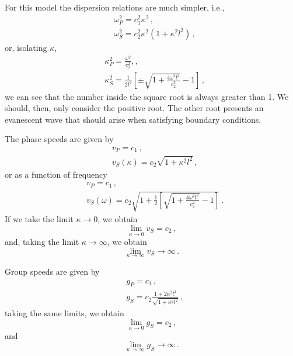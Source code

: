 \documentclass[12pt]{article}
\begin{document}
For this model the dispersion relations are much simpler, i.e.,
\begin{align*}
&\omega_P^2 = c_1^2 \kappa^2\, ,\\
&\omega_S^2 = c_2^2 \kappa^2 (1 + \kappa^2 l^2)\, ,
\end{align*}
or, isolating \(\kappa\),
\begin{align*}
&\kappa_P^2 = \frac{\omega^2}{c_2^2}, ,\\
&\kappa_S^2 = \frac{1}{2 l^2}\left[\pm\sqrt{1 + \frac{4\omega^2 l^2}{c_2^2}} - 1\right]\, ,
\end{align*}
we can see that the number inside the square root is always greater than 1. We should, then, only consider the positive root. The other root presents an evanescent wave that should arise when satisfying boundary conditions.

The phase speeds are given by
\begin{align*}
&v_P = c_1\, ,\\
&v_S(\kappa) = c_2\sqrt{1 + \kappa^2 l^2}\, ,
\end{align*}
or as a function of frequency
\begin{align*}
&v_P = c_1\, ,\\
&v_S(\omega) = c_2\sqrt{1 + \frac{1}{2}\left[\sqrt{1 + \frac{4\omega^2 l^2}{c_2^2}} - 1\right]}\, .
\end{align*}
If we take the limit \(\kappa \rightarrow 0\), we obtain
\[\lim_{\kappa \rightarrow 0} v_S = c_2\, ,\]
and, taking the limit \(\kappa \rightarrow \infty\), we obtain
\[\lim_{\kappa \rightarrow \infty} v_S \rightarrow  \infty\, .\]

Group speeds are given by
\begin{align*}
&g_P = c_1\, ,\\
&g_S = c_2 \frac{1 + 2\kappa^2 l^2}{\sqrt{1 + \kappa^2 l^2}}\, ,
\end{align*}
taking the same limits, we obtain
\[\lim_{\kappa \rightarrow 0} g_S = c_2\, ,\]
and
\[\lim_{\kappa \rightarrow \infty} g_S \rightarrow  \infty\, .\]







\end{document}
